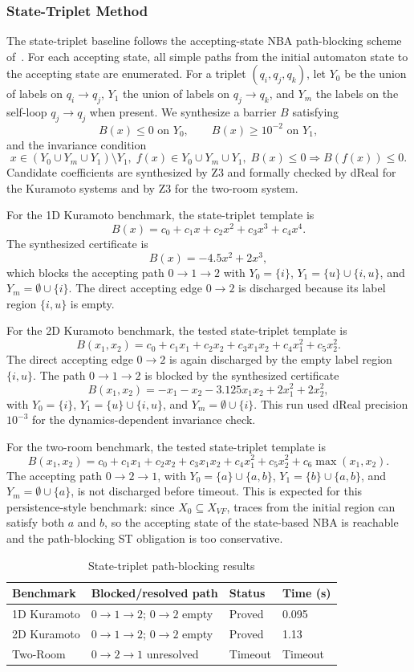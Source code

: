 \subsubsection{State-Triplet Method}
The state-triplet baseline follows the accepting-state NBA path-blocking scheme of~\cite{wongpiromsarn2015automata}. For each accepting state, all simple paths from the initial automaton state to the accepting state are enumerated. For a triplet $(q_i,q_j,q_k)$, let $Y_0$ be the union of labels on $q_i\to q_j$, $Y_1$ the union of labels on $q_j\to q_k$, and $Y_m$ the labels on the self-loop $q_j\to q_j$ when present. We synthesize a barrier $B$ satisfying
\[
B(x)\le 0 \text{ on } Y_0,\qquad
B(x)\ge 10^{-2} \text{ on } Y_1,
\]
and the invariance condition
\[
x\in (Y_0\cup Y_m\cup Y_1)\setminus Y_1,\; f(x)\in Y_0\cup Y_m\cup Y_1,\; B(x)\le 0
\Rightarrow B(f(x))\le 0.
\]
Candidate coefficients are synthesized by Z3 and formally checked by dReal for the Kuramoto systems and by Z3 for the two-room system.

For the 1D Kuramoto benchmark, the state-triplet template is
\[
B(x)=c_0+c_1x+c_2x^2+c_3x^3+c_4x^4.
\]
The synthesized certificate is
\[
B(x)=-4.5x^2+2x^3,
\]
which blocks the accepting path $0\to1\to2$ with $Y_0=\{i\}$, $Y_1=\{u\}\cup\{i,u\}$, and $Y_m=\emptyset\cup\{i\}$. The direct accepting edge $0\to2$ is discharged because its label region $\{i,u\}$ is empty.

For the 2D Kuramoto benchmark, the tested state-triplet template is
\[
B(x_1,x_2)=c_0+c_1x_1+c_2x_2+c_3x_1x_2+c_4x_1^2+c_5x_2^2.
\]
The direct accepting edge $0\to2$ is again discharged by the empty label region $\{i,u\}$. The path $0\to1\to2$ is blocked by the synthesized certificate
\[
B(x_1,x_2)=-x_1-x_2-3.125x_1x_2+2x_1^2+2x_2^2,
\]
with $Y_0=\{i\}$, $Y_1=\{u\}\cup\{i,u\}$, and $Y_m=\emptyset\cup\{i\}$. This run used dReal precision $10^{-3}$ for the dynamics-dependent invariance check.

For the two-room benchmark, the tested state-triplet template is
\[
B(x_1,x_2)=c_0+c_1x_1+c_2x_2+c_3x_1x_2+c_4x_1^2+c_5x_2^2+c_6\max(x_1,x_2).
\]
The accepting path $0\to2\to1$, with $Y_0=\{a\}\cup\{a,b\}$, $Y_1=\{b\}\cup\{a,b\}$, and $Y_m=\emptyset\cup\{a\}$, is not discharged before timeout. This is expected for this persistence-style benchmark: since $X_0\subseteq X_{VF}$, traces from the initial region can satisfy both $a$ and $b$, so the accepting state of the state-based NBA is reachable and the path-blocking ST obligation is too conservative.

\begin{table}[h]
\centering
\caption{State-triplet path-blocking results}
\label{tab:st_path_blocking}
\begin{tabular}{llll}
\hline
\textbf{Benchmark} & \textbf{Blocked/resolved path} & \textbf{Status} & \textbf{Time (s)} \\
\hline
1D Kuramoto & $0\to1\to2$; $0\to2$ empty & Proved & 0.095 \\
2D Kuramoto & $0\to1\to2$; $0\to2$ empty & Proved & 1.13 \\
Two-Room & $0\to2\to1$ unresolved & Timeout & Timeout \\
\hline
\end{tabular}
\end{table}

